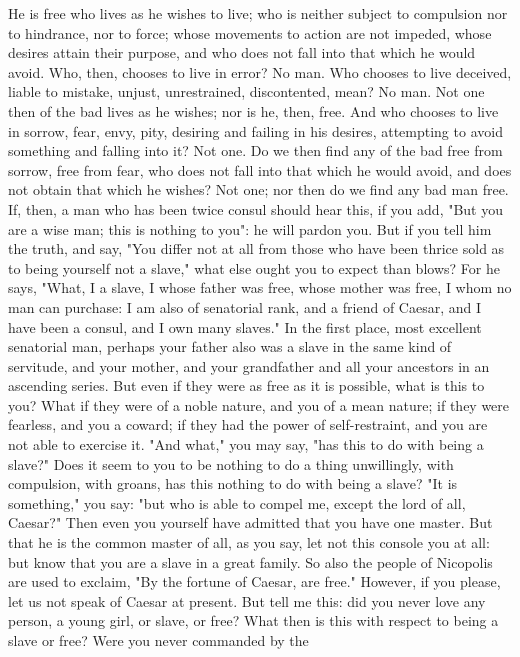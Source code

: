 \documentclass[a4paper]{article}
\begin{document}
    He is free who lives as he wishes to live; who is neither subject to
compulsion nor to hindrance, nor to force; whose movements to action are not
impeded, whose desires attain their purpose, and who does not fall into that
which he would avoid. Who, then, chooses to live in error? No man. Who chooses
to live deceived, liable to mistake, unjust, unrestrained, discontented, mean?
No man. Not one then of the bad lives as he wishes; nor is he, then, free. And
who chooses to live in sorrow, fear, envy, pity, desiring and failing in his
desires, attempting to avoid something and falling into it? Not one. Do we then
find any of the bad free from sorrow, free from fear, who does not fall into
that which he would avoid, and does not obtain that which he wishes? Not one;
nor then do we find any bad man free.
    If, then, a man who has been twice consul should hear this, if you add,
"But you are a wise man; this is nothing to you": he will pardon you. But if
you tell him the truth, and say, "You differ not at all from those who have
been thrice sold as to being yourself not a slave," what else ought you to
expect than blows? For he says, "What, I a slave, I whose father was free,
whose mother was free, I whom no man can purchase: I am also of senatorial
rank, and a friend of Caesar, and I have been a consul, and I own many slaves."
In the first place, most excellent senatorial man, perhaps your father also was
a slave in the same kind of servitude, and your mother, and your grandfather
and all your ancestors in an ascending series. But even if they were as free as
it is possible, what is this to you? What if they were of a noble nature, and
you of a mean nature; if they were fearless, and you a coward; if they had the
power of self-restraint, and you are not able to exercise it.
    "And what," you may say, "has this to do with being a slave?" Does it seem
to you to be nothing to do a thing unwillingly, with compulsion, with groans,
has this nothing to do with being a slave? "It is something," you say: "but who
is able to compel me, except the lord of all, Caesar?" Then even you yourself
have admitted that you have one master. But that he is the common master of
all, as you say, let not this console you at all: but know that you are a slave
in a great family. So also the people of Nicopolis are used to exclaim, "By the
fortune of Caesar, are free."
    However, if you please, let us not speak of Caesar at present. But tell me
this: did you never love any person, a young girl, or slave, or free? What then
is this with respect to being a slave or free? Were you never commanded by the
\end{document}

